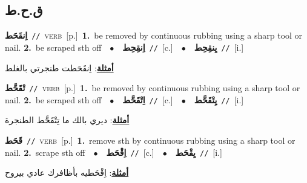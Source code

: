 \documentclass[10pt,a4paper,twoside]{article} %
\begin{document}
\begin{multicols}{2}
\vspace{-3mm}
\subsection*{\color{blue}\foreignlanguage{arabic}{ق.ح.ط}\color{blue}{}} 

{\setlength\topsep{0pt}\textbf{\foreignlanguage{arabic}{اِنقَحَط}}\ {\color{gray}\texttt{//}\color{black}}\ \textsc{verb}\ [p.]\ \textbf{1.}~be removed by continuous rubbing using a sharp tool or nail.  \textbf{2.}~be scraped sth off\ \ $\bullet$\ \ \setlength\topsep{0pt}\textbf{\foreignlanguage{arabic}{اِنقِحِط}}\ {\color{gray}\texttt{//}\color{black}}\ [c.]\ \ $\bullet$\ \ \setlength\topsep{0pt}\textbf{\foreignlanguage{arabic}{يِنقِحِط}}\ {\color{gray}\texttt{//}\color{black}}\ [i.]\  \begin{flushright}\color{gray}\foreignlanguage{arabic}{\textbf{\underline{\foreignlanguage{arabic}{أمثلة}}}: اِنقَحَطت طنجرتي بالغلط}\end{flushright}\color{black}} \vspace{2mm}

{\setlength\topsep{0pt}\textbf{\foreignlanguage{arabic}{تْقَحَّط}}\ {\color{gray}\texttt{//}\color{black}}\ \textsc{verb}\ [p.]\ \textbf{1.}~be removed by continuous rubbing using a sharp tool or nail.  \textbf{2.}~be scraped sth off\ \ $\bullet$\ \ \setlength\topsep{0pt}\textbf{\foreignlanguage{arabic}{اِتْقَحَّط}}\ {\color{gray}\texttt{//}\color{black}}\ [c.]\ \ $\bullet$\ \ \setlength\topsep{0pt}\textbf{\foreignlanguage{arabic}{يِتْقَحَّط}}\ {\color{gray}\texttt{//}\color{black}}\ [i.]\  \begin{flushright}\color{gray}\foreignlanguage{arabic}{\textbf{\underline{\foreignlanguage{arabic}{أمثلة}}}: ديري بالك ما تِتْقَحَّط الطنجرة}\end{flushright}\color{black}} \vspace{2mm}

{\setlength\topsep{0pt}\textbf{\foreignlanguage{arabic}{قَحَط}}\ {\color{gray}\texttt{//}\color{black}}\ \textsc{verb}\ [p.]\ \textbf{1.}~remove sth by continuous rubbing using a sharp tool or nail.  \textbf{2.}~scrape sth off\ \ $\bullet$\ \ \setlength\topsep{0pt}\textbf{\foreignlanguage{arabic}{اِقْحَط}}\ {\color{gray}\texttt{//}\color{black}}\ [c.]\ \ $\bullet$\ \ \setlength\topsep{0pt}\textbf{\foreignlanguage{arabic}{يِقْحَط}}\ {\color{gray}\texttt{//}\color{black}}\ [i.]\  \begin{flushright}\color{gray}\foreignlanguage{arabic}{\textbf{\underline{\foreignlanguage{arabic}{أمثلة}}}: اِقْحَطيه بأظافرك عادي بيروح}\end{flushright}\color{black}} \vspace{2mm}


\end{multicols}
\end{document}

